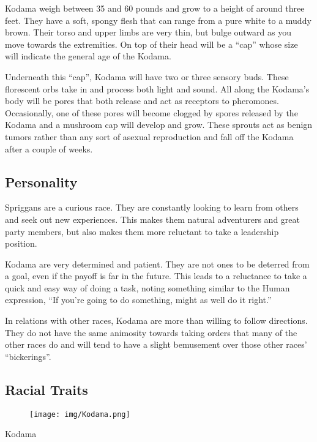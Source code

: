 Kodama weigh between 35 and 60 pounds and grow to a height of around three feet. They have a soft, spongy flesh that can range from a pure white to a muddy brown. Their torso and upper limbs are very thin, but bulge outward as you move towards the extremities. On top of their head will be a “cap” whose size will indicate the general age of the Kodama.

Underneath this “cap”, Kodama will have two or three sensory buds. These florescent orbs take in and process both light and sound. All along the Kodama’s body will be pores that both release and act as receptors to pheromones. Occasionally, one of these pores will become clogged by spores released by the Kodama and a mushroom cap will develop and grow. These sprouts act as benign tumors rather than any sort of asexual reproduction and fall off the Kodama after a couple of weeks.

\subsection*{Personality}

Spriggans are a curious race. They are constantly looking to learn from others and seek out new experiences. This makes them natural adventurers and great party members, but also makes them more reluctant to take a leadership position.

Kodama are very determined and patient. They are not ones to be deterred from a goal, even if the payoff is far in the future. This leads to a reluctance to take a quick and easy way of doing a task, noting something similar to the Human expression, “If you’re going to do something, might as well do it right.”

In relations with other races, Kodama are more than willing to follow directions. They do not have the same animosity towards taking orders that many of the other races do and will tend to have a slight bemusement over those other races’ “bickerings”. 

\newpage

\subsection*{Racial Traits}

\begin{figure}[ht!]
	\texttt{[image: img/Kodama.png]}
\end{figure}

\begin{monsterbox}{Kodama}
	\vspace{.1in}
	\hline
	\stats[
	STR = -1,
	DEX = +1,
	VIT = +1,
	FOC = -1,
	WILL = +1
	]
	\hline
\end{monsterbox}

